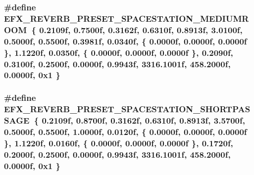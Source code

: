 \subsubsection[{\texorpdfstring{E\+F\+X\+\_\+\+R\+E\+V\+E\+R\+B\+\_\+\+P\+R\+E\+S\+E\+T\+\_\+\+S\+P\+A\+C\+E\+S\+T\+A\+T\+I\+O\+N\+\_\+\+M\+E\+D\+I\+U\+M\+R\+O\+OM}{EFX_REVERB_PRESET_SPACESTATION_MEDIUMROOM}}]{\setlength{\rightskip}{0pt plus 5cm}\#define E\+F\+X\+\_\+\+R\+E\+V\+E\+R\+B\+\_\+\+P\+R\+E\+S\+E\+T\+\_\+\+S\+P\+A\+C\+E\+S\+T\+A\+T\+I\+O\+N\+\_\+\+M\+E\+D\+I\+U\+M\+R\+O\+OM~\{ 0.\+2109f, 0.\+7500f, 0.\+3162f, 0.\+6310f, 0.\+8913f, 3.\+0100f, 0.\+5000f, 0.\+5500f, 0.\+3981f, 0.\+0340f, \{ 0.\+0000f, 0.\+0000f, 0.\+0000f \}, 1.\+1220f, 0.\+0350f, \{ 0.\+0000f, 0.\+0000f, 0.\+0000f \}, 0.\+2090f, 0.\+3100f, 0.\+2500f, 0.\+0000f, 0.\+9943f, 3316.\+1001f, 458.\+2000f, 0.\+0000f, 0x1 \}}\hypertarget{efx-presets_8h_a2ca95e780372e4102f6439c01bbb4c47}{}\label{efx-presets_8h_a2ca95e780372e4102f6439c01bbb4c47}
\subsubsection[{\texorpdfstring{E\+F\+X\+\_\+\+R\+E\+V\+E\+R\+B\+\_\+\+P\+R\+E\+S\+E\+T\+\_\+\+S\+P\+A\+C\+E\+S\+T\+A\+T\+I\+O\+N\+\_\+\+S\+H\+O\+R\+T\+P\+A\+S\+S\+A\+GE}{EFX_REVERB_PRESET_SPACESTATION_SHORTPASSAGE}}]{\setlength{\rightskip}{0pt plus 5cm}\#define E\+F\+X\+\_\+\+R\+E\+V\+E\+R\+B\+\_\+\+P\+R\+E\+S\+E\+T\+\_\+\+S\+P\+A\+C\+E\+S\+T\+A\+T\+I\+O\+N\+\_\+\+S\+H\+O\+R\+T\+P\+A\+S\+S\+A\+GE~\{ 0.\+2109f, 0.\+8700f, 0.\+3162f, 0.\+6310f, 0.\+8913f, 3.\+5700f, 0.\+5000f, 0.\+5500f, 1.\+0000f, 0.\+0120f, \{ 0.\+0000f, 0.\+0000f, 0.\+0000f \}, 1.\+1220f, 0.\+0160f, \{ 0.\+0000f, 0.\+0000f, 0.\+0000f \}, 0.\+1720f, 0.\+2000f, 0.\+2500f, 0.\+0000f, 0.\+9943f, 3316.\+1001f, 458.\+2000f, 0.\+0000f, 0x1 \}}\hypertarget{efx-presets_8h_a6d8fba878e713dcc1f9823e5e4a8ec8d}{}\label{efx-presets_8h_a6d8fba878e713dcc1f9823e5e4a8ec8d}
